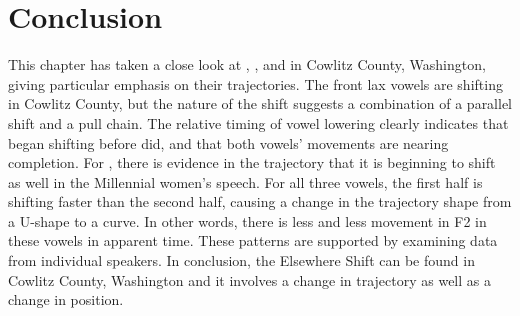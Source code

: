 \section{Conclusion}
\label{bat_bet_bit_conclusion}

This chapter has taken a close look at \bat, \bet, and \bit in Cowlitz County, Washington, giving particular emphasis on their trajectories. The front lax vowels are shifting in Cowlitz County, but the nature of the shift suggests a combination of a parallel shift and a pull chain. The relative timing of vowel lowering clearly indicates that \bat began shifting before \bet did, and that both vowels' movements are nearing completion. For \bit, there is evidence in the trajectory that it is beginning to shift as well in the Millennial women's speech. For all three vowels, the first half is shifting faster than the second half, causing a change in the trajectory shape from a U-shape to a curve. In other words, there is less and less movement in F2 in these vowels in apparent time. These patterns are supported by examining data from individual speakers. In conclusion, the Elsewhere Shift can be found in Cowlitz County, Washington and it involves a change in trajectory as well as a change in position.
